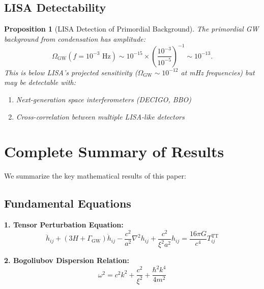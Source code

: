 \documentclass[11pt,a4paper]{article}
\newtheorem{proposition}[theorem]{Proposition}
\theoremstyle{definition}
\theoremstyle{remark}
\begin{document}
\subsection{LISA Detectability}
\label{sec:lisa_detectability}

\begin{proposition}[LISA Detection of Primordial Background]
\label{prop:lisa_primordial}
The primordial GW background from condensation has amplitude:
\begin{equation}
\Omega_{\mathrm{GW}}(f = 10^{-3} \text{ Hz}) \sim 10^{-15} \times \left(\frac{10^{-3}}{10^{-5}}\right)^{-1} \sim 10^{-13}.
\end{equation}
This is below LISA's projected sensitivity ($\Omega_{\mathrm{GW}} \sim 10^{-12}$ at mHz frequencies) but may be detectable with:
\begin{enumerate}[label=(\alph*)]
\item Next-generation space interferometers (DECIGO, BBO)
\item Cross-correlation between multiple LISA-like detectors
\end{enumerate}
\end{proposition}

\section{Complete Summary of Results}
\label{sec:summary}

We summarize the key mathematical results of this paper:

\subsection{Fundamental Equations}

\textbf{1. Tensor Perturbation Equation:}
\begin{equation}
\ddot{h}_{ij} + (3H + \Gamma_{\mathrm{GW}})\dot{h}_{ij} - \frac{c^2}{a^2}\nabla^2 h_{ij} + \frac{c^2}{\xi^2 a^2}h_{ij} = \frac{16\pi G}{c^4}T_{ij}^{\mathrm{TT}}
\end{equation}

\textbf{2. Bogoliubov Dispersion Relation:}
\begin{equation}
\omega^2 = c^2 k^2 + \frac{c^2}{\xi^2} + \frac{\hbar^2 k^4}{4m^2}
\end{equation}
\end{document}
